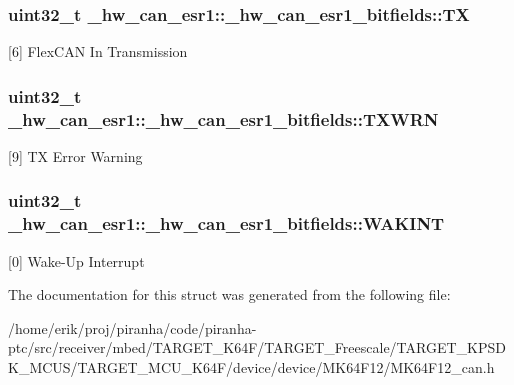 \subsubsection[{\texorpdfstring{TX}{TX}}]{\setlength{\rightskip}{0pt plus 5cm}uint32\+\_\+t \+\_\+hw\+\_\+can\+\_\+esr1\+::\+\_\+hw\+\_\+can\+\_\+esr1\+\_\+bitfields\+::\+TX}\hypertarget{struct__hw__can__esr1_1_1__hw__can__esr1__bitfields_a860c19cb8170407bbeaad62dac9d7849}{}\label{struct__hw__can__esr1_1_1__hw__can__esr1__bitfields_a860c19cb8170407bbeaad62dac9d7849}
\mbox{[}6\mbox{]} Flex\+C\+AN In Transmission 
\subsubsection[{\texorpdfstring{T\+X\+W\+RN}{TXWRN}}]{\setlength{\rightskip}{0pt plus 5cm}uint32\+\_\+t \+\_\+hw\+\_\+can\+\_\+esr1\+::\+\_\+hw\+\_\+can\+\_\+esr1\+\_\+bitfields\+::\+T\+X\+W\+RN}\hypertarget{struct__hw__can__esr1_1_1__hw__can__esr1__bitfields_ab54299ef7bafabf9d29b4d4efac3ea7e}{}\label{struct__hw__can__esr1_1_1__hw__can__esr1__bitfields_ab54299ef7bafabf9d29b4d4efac3ea7e}
\mbox{[}9\mbox{]} TX Error Warning 
\subsubsection[{\texorpdfstring{W\+A\+K\+I\+NT}{WAKINT}}]{\setlength{\rightskip}{0pt plus 5cm}uint32\+\_\+t \+\_\+hw\+\_\+can\+\_\+esr1\+::\+\_\+hw\+\_\+can\+\_\+esr1\+\_\+bitfields\+::\+W\+A\+K\+I\+NT}\hypertarget{struct__hw__can__esr1_1_1__hw__can__esr1__bitfields_af22efeca0789da9a46947084175f9d2e}{}\label{struct__hw__can__esr1_1_1__hw__can__esr1__bitfields_af22efeca0789da9a46947084175f9d2e}
\mbox{[}0\mbox{]} Wake-\/\+Up Interrupt 

The documentation for this struct was generated from the following file\+:\begin{DoxyCompactItemize}
\item 
/home/erik/proj/piranha/code/piranha-\/ptc/src/receiver/mbed/\+T\+A\+R\+G\+E\+T\+\_\+\+K64\+F/\+T\+A\+R\+G\+E\+T\+\_\+\+Freescale/\+T\+A\+R\+G\+E\+T\+\_\+\+K\+P\+S\+D\+K\+\_\+\+M\+C\+U\+S/\+T\+A\+R\+G\+E\+T\+\_\+\+M\+C\+U\+\_\+\+K64\+F/device/device/\+M\+K64\+F12/M\+K64\+F12\+\_\+can.\+h\end{DoxyCompactItemize}

